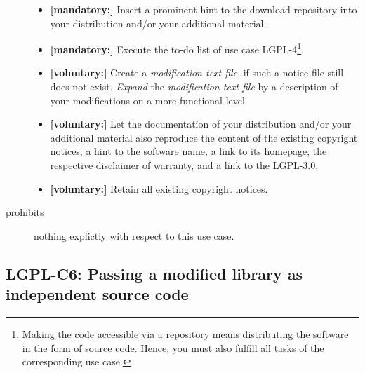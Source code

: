 \begin{description}
\begin{itemize}
  \item \textbf{[mandatory:]} Insert a prominent hint to the download repository
  into your distribution and/or your additional material.
  
  \item \textbf{[mandatory:]} Execute the to-do list of use case LGPL-4\footnote{
  Making the code accessible via a repository means distributing the software in
  the form of source code. Hence, you must also fulfill all tasks of the
  corresponding use case.}.
    
  \item \textbf{[voluntary:]} Create a \emph{modification text file}, if such a
  notice file still does not exist. \emph{Expand} the \emph{modification text
  file} by a description of your modifications on a more functional level.
  
  \item \textbf{[voluntary:]} Let the documentation of your distribution and/or
  your additional material also reproduce the content of the existing
  copyright notices, a hint to the software name, a link to its homepage,
  the respective disclaimer of warranty, and a link to the LGPL-3.0.
  
  \item \textbf{[voluntary:]} Retain all existing copyright notices. 


\end{itemize}

\item[prohibits] nothing explictly with respect to this use case.

\end{description}

\subsection{LGPL-C6: Passing a modified library as independent source code}
\label{OSUC-08S-LGPL}

